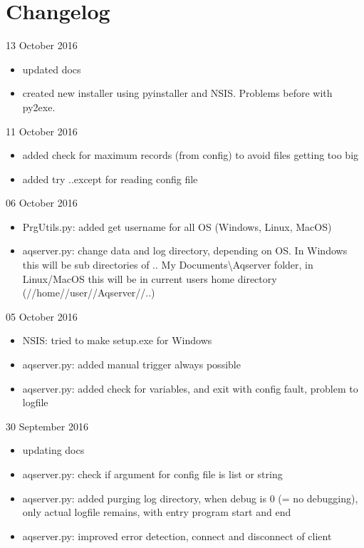\documentclass[a4paper,10pt,english]{sphinxmanual}
\begin{document}
\chapter{Changelog}
\label{changelog::doc}\label{changelog:changelog}
13 October 2016
\begin{itemize}
\item {} 
updated docs

\item {} 
created new installer using pyinstaller and NSIS. Problems before with py2exe.

\end{itemize}

11 October 2016
\begin{itemize}
\item {} 
added check for maximum records (from config) to avoid files getting too big

\item {} 
added try ..except for reading config file

\end{itemize}

06 October 2016
\begin{itemize}
\item {} 
PrgUtils.py: added get username for all OS (Windows, Linux, MacOS)

\item {} 
aqserver.py: change data and log directory, depending on OS. In Windows this will be sub directories of .. My Documents\textbackslash{}Aqserver folder, in Linux/MacOS this will be in current users home directory (//home//user//Aqserver//..)

\end{itemize}

05 October 2016
\begin{itemize}
\item {} 
NSIS: tried to make setup.exe for Windows

\item {} 
aqserver.py: added manual trigger always possible

\item {} 
aqserver.py: added check for variables, and exit with config fault, problem to logfile

\end{itemize}

30 September 2016
\begin{itemize}
\item {} 
updating docs

\item {} 
aqserver.py: check if argument for config file is list or string

\item {} 
aqserver.py: added purging log directory, when debug is 0 (= no debugging), only actual logfile remains, with entry program start and end

\item {} 
aqserver.py: improved error detection, connect and disconnect of client

\end{itemize}
\end{document}

